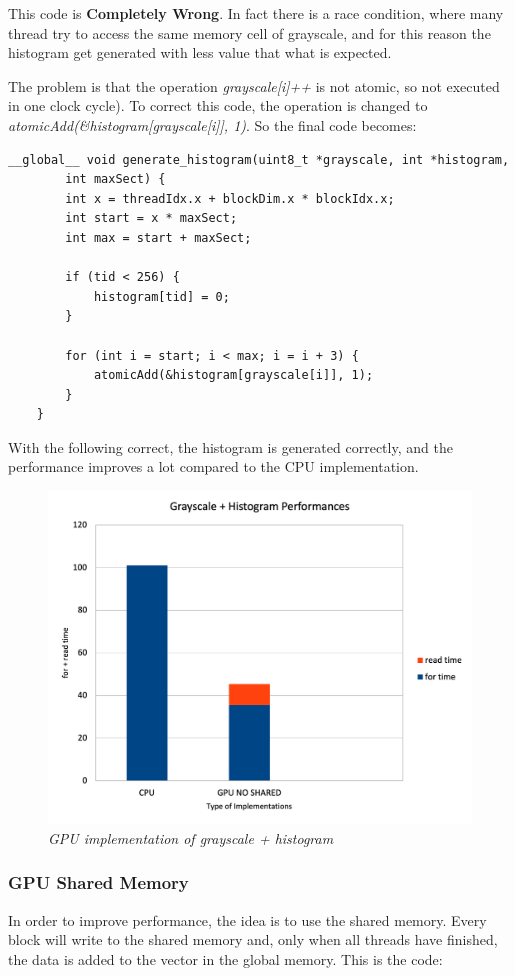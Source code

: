 \documentclass[paper=a4, fontsize=10pt]{scrartcl}	%
\begin{document}
	This code is \textbf{Completely Wrong}. In fact there is a race condition, where many thread try to access the same memory cell of grayscale, and for this reason the histogram get generated with less value that what is expected.

	The problem is that the operation \textit{grayscale[i]++} is not atomic, so not executed in one clock cycle). To correct this code, the operation is changed to \textit{atomicAdd(\&histogram[grayscale[i]], 1)}. So the final code becomes:

	\begin{lstlisting}[style=CStyle]
	__global__ void generate_histogram(uint8_t *grayscale, int *histogram, 
		int maxSect) {
		int x = threadIdx.x + blockDim.x * blockIdx.x;
		int start = x * maxSect;
		int max = start + maxSect;

	    if (tid < 256) {
        	histogram[tid] = 0;
    	}

		for (int i = start; i < max; i = i + 3) {
	        atomicAdd(&histogram[grayscale[i]], 1);
		}
	}
	\end{lstlisting}

	With the following correct, the histogram is generated correctly, and the performance improves a lot compared to the CPU implementation.

	\begin{figure}[H]
		\centering
		\includegraphics[width=0.65\linewidth]{images/binarization/hist2.png}
		\caption{\textit{GPU implementation of grayscale + histogram}}
		\label{fig:grayscale-histogram-v2}
	\end{figure}


	\subsubsection{GPU Shared Memory}

	In order to improve performance, the idea is to use the shared memory. Every block will write to the shared memory and, only when all threads have finished, the data is added to the vector in the global memory. This is the code:
\end{document}
